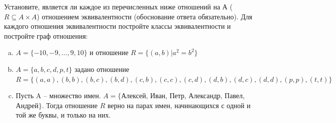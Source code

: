 \question
Установите, является ли каждое из перечисленных ниже отношений на А ($R \subseteq A \times A$) отношением эквивалентности (обоснование ответа обязательно). Для каждого отношения эквивалентности постройте классы 
эквивалентности и постройте граф отношения:
\begin{enumerate} [a)]\setcounter{enumi}{0}
\item $A = \{-10, -9, … , 9, 10\}$ и отношение $R = \{(a,b)|a^{2} = b^{2}\}$
\item $A = \{a, b, c, d, p, t\}$ задано отношение $R = \{(a, a), (b, b), (b, c), (b, d), (c, b), (c, c), (c, d), (d, b), (d, c), (d, d), (p,p), (t,t)\}$
\item Пусть A – множество имен. $A = \{ $Алексей, Иван, Петр, Александр, Павел, Андрей$ \}$. Тогда отношение $R$ верно на парах имен, начинающихся с одной и той же буквы, и только на них.
\end{enumerate}